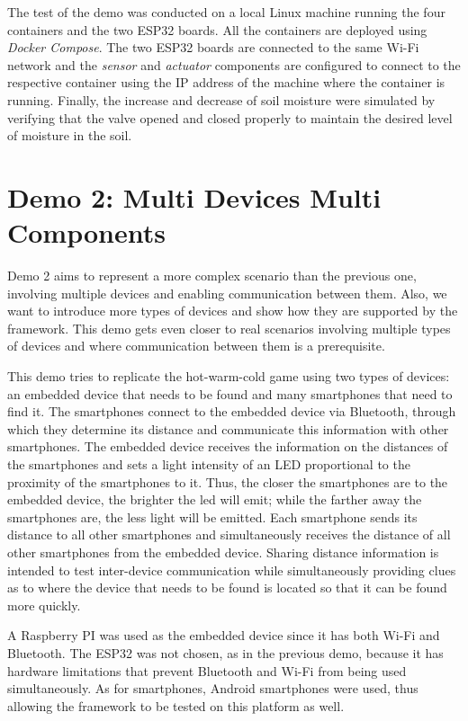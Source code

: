 The test of the demo was conducted on a local Linux machine running the four containers and the two ESP32 boards. All the containers are deployed
using \emph{Docker Compose}.
The two ESP32 boards are connected to the same Wi-Fi network and the \emph{sensor} and \emph{actuator} components are configured to connect to the
respective container using the IP address of the machine where the container is running.
Finally, the increase and decrease of soil moisture were simulated by verifying that the valve opened and closed properly to maintain the desired
level of moisture in the soil.

\section{Demo 2: Multi Devices Multi Components}
\label{sec:demo-2}

Demo 2 aims to represent a more complex scenario than the previous one, involving multiple devices and enabling communication between them.
Also, we want to introduce more types of devices and show how they are supported by the framework.
This demo gets even closer to real scenarios involving multiple types of devices and where communication between them is a prerequisite.

This demo tries to replicate the hot-warm-cold game using two types of devices: an embedded device that needs to be found and many smartphones that
need to find it. The smartphones connect to the embedded device via Bluetooth, through which they determine its distance and communicate
this information with other smartphones. The embedded device receives the information on the distances of the smartphones and sets a light intensity
of an LED proportional to the proximity of the smartphones to it. Thus, the closer the smartphones are to the embedded device, the brighter the led
will emit; while the farther away the smartphones are, the less light will be emitted.
Each smartphone sends its distance to all other smartphones and simultaneously receives the distance of all other smartphones from the embedded
device. Sharing distance information is intended to test inter-device communication while simultaneously providing clues as to where the device that
needs to be found is located so that it can be found more quickly.

A Raspberry PI was used as the embedded device since it has both Wi-Fi and Bluetooth. The ESP32 was not chosen, as in the previous demo, because it
has hardware limitations that prevent Bluetooth and Wi-Fi from being used simultaneously. As for smartphones, Android smartphones were used, thus
allowing the framework to be tested on this platform as well.

